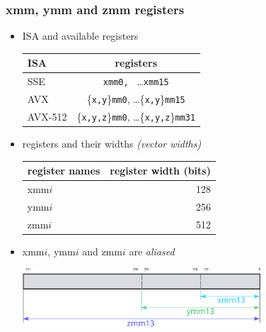 \documentclass[12pt,dvipdfmx]{beamer}
\newcommand{\ao}[1]{{\color{blue}#1}}
\begin{document}
\begin{frame}
  \frametitle{xmm, ymm and zmm registers}
  \begin{itemize}
  \item ISA and available registers
{\small
    \begin{tabular}{|l|c|}\hline
ISA     & registers         \\\hline
SSE     & {\tt xmm0, } \ldots {\tt xmm15}  \\
AVX     & \{{\tt x,y}\}{\tt mm0},  \ldots \{{\tt x,y}\}{\tt mm15} \\
AVX-512 & \{{\tt x,y,z}\}{\tt mm0}, \ldots \{{\tt x,y,z}\}{\tt mm31} \\\hline
\end{tabular}}
\item registers and their widths \ao{\it (vector widths)}
{\small
  \begin{tabular}{|l|r|}\hline
register names & register width (bits) \\\hline
xmm$i$   & 128    \\
ymm$i$   & 256    \\
zmm$i$   & 512    \\\hline
  \end{tabular}}

\item xmm$i$, ymm$i$ and zmm$i$ are \ao{\it aliased}

  \begin{center}
    \includegraphics[width=0.7\textwidth]{out/pdf/svg/xmm_ymm_zmm_1.pdf}
  \end{center}
  
\end{itemize}  
\end{frame}
\end{document}
